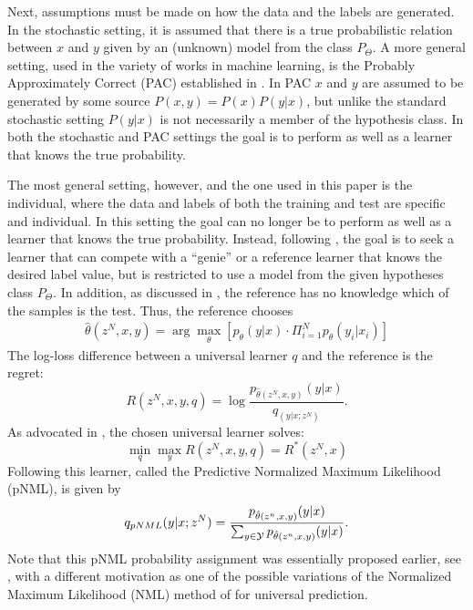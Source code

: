 \documentclass[conference,letterpaper]{IEEEtran}
\def\pNMLSingle{p_{\hat{\theta}(z^n,x,y)} (y|x)}
\begin{document}
Next, assumptions must be made on how the data and the labels are generated. 
In the stochastic setting, it is assumed that there is a true probabilistic relation between $x$ and $y$ given by an (unknown) model from the class $P_\Theta$. 
A more general setting, used in the variety of works in machine learning, is the Probably Approximately Correct (PAC) established in  \cite{valiant1984theory}. 
In PAC $x$ and $y$ are assumed to be generated by some source $P(x,y)=P(x)P(y|x)$, but unlike the standard stochastic setting $P(y|x)$ is not necessarily a member of the hypothesis class. 
In both the stochastic and PAC settings the goal is to perform as well as a learner that knows the true probability.

The most general setting, however, and the one used in this paper is 
the individual, where the data and labels of both the training and test are specific and individual.
In this setting the goal can no longer be to perform as well as a learner that knows the true probability. Instead, following \cite{universal_prediction}, the goal is to seek a learner that can compete with a ``genie'' or a reference learner that knows the desired label value, but is restricted to use a model from the given hypotheses class $P_\Theta$. In addition, as discussed in \cite{FogelFeder2018}, the reference has no knowledge which of the samples is the test. Thus, the reference chooses
\begin{align} \hat{\theta}(z^N,x,y)  = \arg\max_\theta \left[ p_\theta(y|x) \cdot\Pi_{i=1}^N p_\theta(y_i|x_i) \right] \end{align}
The log-loss difference between a universal learner $q$ and the reference is the regret:
\begin{equation} \label{eq:genie_regret}
R(z^N,x,y,q) = \log \frac{p_{\hat{\theta}(z^N,x,y)}(y|x)}{q_(y|x;z^N)}.
\end{equation}
As advocated in \cite{FogelFeder2018}, the chosen universal learner solves:
\begin{equation} \label{eq:minmax_prob}
\min_q \max_y R(z^N,x,y,q) = R^*(z^N,x)
\end{equation}
Following \cite{shtar1987universal} this learner, called the Predictive Normalized Maximum Likelihood (pNML), is given by
\begin{equation} \label{eq:pNML}
q_{\mbox{\tiny{pNML}}}(y|x;z^N)=\frac{\pNMLSingle}{\sum_{y\in {\cal Y}} \pNMLSingle}.
\end{equation}
Note that this pNML probability assignment was essentially proposed earlier, see \cite{roos2008sequentially,roos2008bayesian}, with a different motivation as one of the possible variations of the Normalized Maximum Likelihood (NML) method of \cite{shtar1987universal} for universal prediction.
\end{document}
